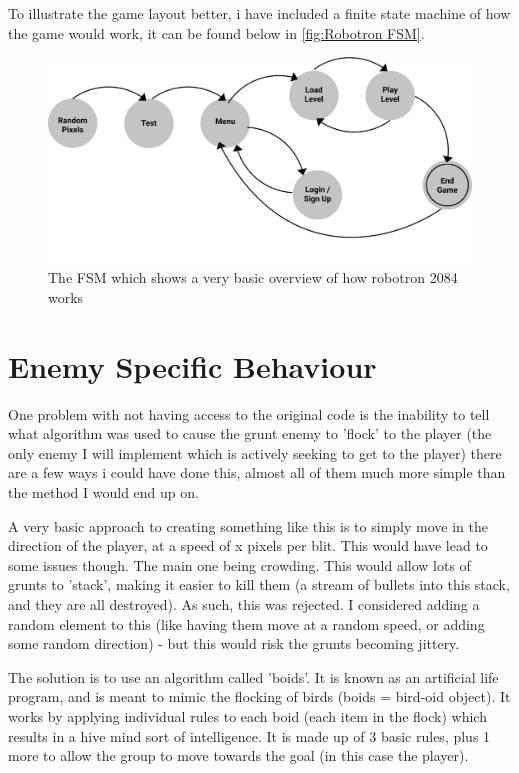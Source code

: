 To illustrate the game layout better, i have included a finite state machine of how the game would work, it can be found below in \ref{fig:Robotron FSM}.

\begin{figure}[ht!]
  \includegraphics[width=0.8\linewidth]{Figures/FSM_robotrom.png}
  \centering
  \caption{The FSM which shows a very basic overview of how robotron 2084 works}
  \label{fig:Robotron_FSM}
\end{figure}


\section{Enemy Specific Behaviour}
One problem with not having access to the original code is the inability to tell what algorithm was used to cause the grunt enemy to 'flock' to the player (the only enemy I will implement which is actively seeking to get to the player) there are a few ways i could have done this, almost all of them much more simple than the method I would end up on.

A very basic approach to creating something like this is to simply move in the direction of the player, at a speed of x pixels per blit. This would have lead to some issues though. The main one being crowding. This would allow lots of grunts to 'stack', making it easier to kill them (a stream of bullets into this stack, and they are all destroyed). As such, this was rejected. I considered adding a random element to this (like having them move at a random speed, or adding some random direction) - but this would risk the grunts becoming jittery.

The solution is to use an algorithm called 'boids'. It is known as an artificial life program, and is meant to mimic the flocking of birds (boids = bird-oid object). It works by applying individual rules to each boid (each item in the flock) which results in a hive mind sort of intelligence. It is made up of 3 basic rules, plus 1 more to allow the group to move towards the goal (in this case the player).

